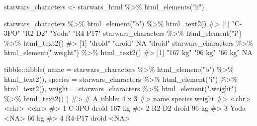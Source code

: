 \documentclass[
  letterpaper,
  DIV=11,
  numbers=noendperiod]{scrreprt}
\newenvironment{Shaded}{\begin{snugshade}}{\end{snugshade}}
\newcommand{\AttributeTok}[1]{\textcolor[rgb]{0.40,0.45,0.13}{#1}}
\newcommand{\CommentTok}[1]{\textcolor[rgb]{0.37,0.37,0.37}{#1}}
\newcommand{\FunctionTok}[1]{\textcolor[rgb]{0.28,0.35,0.67}{#1}}
\newcommand{\NormalTok}[1]{\textcolor[rgb]{0.00,0.23,0.31}{#1}}
\newcommand{\OtherTok}[1]{\textcolor[rgb]{0.00,0.23,0.31}{#1}}
\newcommand{\SpecialCharTok}[1]{\textcolor[rgb]{0.37,0.37,0.37}{#1}}
\newcommand{\StringTok}[1]{\textcolor[rgb]{0.13,0.47,0.30}{#1}}
\begin{document}
\begin{Shaded}
\begin{Highlighting}[]
\NormalTok{starwars\_characters }\OtherTok{\textless{}{-}}\NormalTok{ starwars\_html }\SpecialCharTok{\%\textgreater{}\%} \FunctionTok{html\_elements}\NormalTok{(}\StringTok{"li"}\NormalTok{)}

\NormalTok{starwars\_characters }\SpecialCharTok{\%\textgreater{}\%} \FunctionTok{html\_element}\NormalTok{(}\StringTok{"b"}\NormalTok{) }\SpecialCharTok{\%\textgreater{}\%} \FunctionTok{html\_text2}\NormalTok{()}
\CommentTok{\#\textgreater{} [1] "C{-}3PO"  "R2{-}D2"  "Yoda"   "R4{-}P17"}
\NormalTok{starwars\_characters }\SpecialCharTok{\%\textgreater{}\%} \FunctionTok{html\_element}\NormalTok{(}\StringTok{"i"}\NormalTok{) }\SpecialCharTok{\%\textgreater{}\%} \FunctionTok{html\_text2}\NormalTok{()}
\CommentTok{\#\textgreater{} [1] "droid" "droid" NA      "droid"}
\NormalTok{starwars\_characters }\SpecialCharTok{\%\textgreater{}\%} \FunctionTok{html\_element}\NormalTok{(}\StringTok{".weight"}\NormalTok{) }\SpecialCharTok{\%\textgreater{}\%} \FunctionTok{html\_text2}\NormalTok{()}
\CommentTok{\#\textgreater{} [1] "167 kg" "96 kg"  "66 kg"  NA}
\end{Highlighting}
\end{Shaded}

\begin{Shaded}
\begin{Highlighting}[]
\NormalTok{tibble}\SpecialCharTok{::}\FunctionTok{tibble}\NormalTok{(}
  \AttributeTok{name =}\NormalTok{ starwars\_characters }\SpecialCharTok{\%\textgreater{}\%} \FunctionTok{html\_element}\NormalTok{(}\StringTok{"b"}\NormalTok{) }\SpecialCharTok{\%\textgreater{}\%} \FunctionTok{html\_text2}\NormalTok{(),}
  \AttributeTok{species =}\NormalTok{ starwars\_characters }\SpecialCharTok{\%\textgreater{}\%} \FunctionTok{html\_element}\NormalTok{(}\StringTok{"i"}\NormalTok{) }\SpecialCharTok{\%\textgreater{}\%} \FunctionTok{html\_text2}\NormalTok{(),}
  \AttributeTok{weight =}\NormalTok{ starwars\_characters }\SpecialCharTok{\%\textgreater{}\%} \FunctionTok{html\_element}\NormalTok{(}\StringTok{".weight"}\NormalTok{) }\SpecialCharTok{\%\textgreater{}\%} \FunctionTok{html\_text2}\NormalTok{()}
\NormalTok{)}
\CommentTok{\#\textgreater{} \# A tibble: 4 x 3}
\CommentTok{\#\textgreater{}   name   species weight}
\CommentTok{\#\textgreater{}   \textless{}chr\textgreater{}  \textless{}chr\textgreater{}   \textless{}chr\textgreater{} }
\CommentTok{\#\textgreater{} 1 C{-}3PO  droid   167 kg}
\CommentTok{\#\textgreater{} 2 R2{-}D2  droid   96 kg }
\CommentTok{\#\textgreater{} 3 Yoda   \textless{}NA\textgreater{}    66 kg }
\CommentTok{\#\textgreater{} 4 R4{-}P17 droid   \textless{}NA\textgreater{}}
\end{Highlighting}
\end{Shaded}
\end{document}
